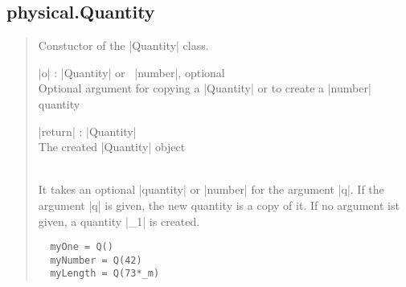 \documentclass{ltxdoc}
\begin{document}
\subsection{physical.Quantity}



\begin{quote}
  Constuctor of the |Quantity| class.

  \subtitle{Parameters}
  \begin{description}
    \item |o| : |Quantity| or \ |number|, optional\\
      Optional argument for copying a |Quantity| or to create a |number| quantity

    \item |return| : |Quantity|\\
    The created |Quantity| object
  \end{description}

  \subtitle{Notes}\\
  It takes an optional |quantity| or |number| for the argument |q|. If the argument |q| is given, the new quantity is a copy of it. If no argument ist given, a quantity |_1| is created.

  \subtitle{Examples}
  \begin{lstlisting}
  myOne = Q()
  myNumber = Q(42)
  myLength = Q(73*_m)
  \end{lstlisting}
\end{quote}
\end{document}
